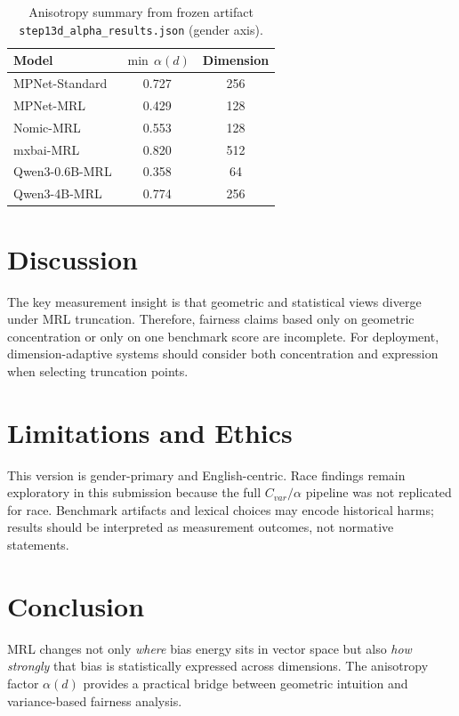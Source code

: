 \documentclass[conference]{IEEEtran}
\begin{document}
\begin{table}[t]
\caption{Anisotropy summary from frozen artifact \texttt{step13d\_alpha\_results.json} (gender axis).}
\label{tab:alpha-summary}
\centering
\begin{tabular}{lcc}
\toprule
Model & $\min\,\alpha(d)$ & Dimension \\
\midrule
MPNet-Standard & 0.727 & 256 \\
MPNet-MRL & 0.429 & 128 \\
Nomic-MRL & 0.553 & 128 \\
mxbai-MRL & 0.820 & 512 \\
Qwen3-0.6B-MRL & 0.358 & 64 \\
Qwen3-4B-MRL & 0.774 & 256 \\
\bottomrule
\end{tabular}
\end{table}

\section{Discussion}
The key measurement insight is that geometric and statistical views diverge under MRL truncation. Therefore, fairness claims based only on geometric concentration or only on one benchmark score are incomplete. For deployment, dimension-adaptive systems should consider both concentration and expression when selecting truncation points.

\section{Limitations and Ethics}
This version is gender-primary and English-centric. Race findings remain exploratory in this submission because the full $C_{var}/\alpha$ pipeline was not replicated for race. Benchmark artifacts and lexical choices may encode historical harms; results should be interpreted as measurement outcomes, not normative statements.

\section{Conclusion}
MRL changes not only \emph{where} bias energy sits in vector space but also \emph{how strongly} that bias is statistically expressed across dimensions. The anisotropy factor $\alpha(d)$ provides a practical bridge between geometric intuition and variance-based fairness analysis.
\end{document}
